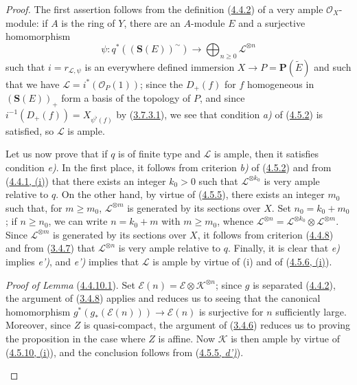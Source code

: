 \begin{proof}
The first assertion follows from the definition
(\hyperref[II.4.4.2]{4.4.2}) of a very ample $\mathcal{O}_X$-module: if
$A$ is the ring of $Y$, there are an $A$-module $E$ and a surjective
homomorphism
\[
  \psi:q^*((\mathbf{S}(E))^{\sim})\longrightarrow
  \bigoplus_{n\geq0}\mathcal{L}^{\otimes n}
\]
such that $i=r_{\mathcal{L},\psi}$ is an everywhere defined immersion
$X\to P=\mathbf{P}(\widetilde{E})$ and such that we have
$\mathcal{L}=i^*(\mathcal{O}_P(1))$; since the $D_+(f)$ for $f$ homogeneous
in $(\mathbf{S}(E))_+$ form a basis of the topology of $P$, and since
$i^{-1}(D_+(f))=X_{\psi^\flat(f)}$ by
(\hyperref[II.3.7.3.1]{3.7.3.1}), we see that condition \emph{a)} of
(\hyperref[II.4.5.2]{4.5.2}) is satisfied, so $\mathcal{L}$ is ample.

Let us now prove that if $q$ is of finite type and $\mathcal{L}$ is
ample, then it satisfies condition \emph{e)}. In the first place, it follows from criterion \emph{b)}
of (\hyperref[II.4.5.2]{4.5.2}) and from
(\hyperref[II.4.4.1]{4.4.1, (i)}) that there exists
an integer $k_0>0$ such that $\mathcal{L}^{\otimes k_0}$ is very ample
relative to $q$. On the other hand, by virtue of
(\hyperref[II.4.5.5]{4.5.5}), there exists an integer $m_0$ such that, for
$m\geq m_0$, $\mathcal{L}^{\otimes m}$ is generated by its sections
over $X$. Set $n_0=k_0+m_0$; if $n\geq n_0$, we can write
$n=k_0+m$ with $m\geq m_0$, whence
$\mathcal{L}^{\otimes n}
=\mathcal{L}^{\otimes k_0}\otimes\mathcal{L}^{\otimes m}$. Since
$\mathcal{L}^{\otimes m}$ is generated by its sections over $X$, it
follows from criterion (\hyperref[II.4.4.8]{4.4.8}) and from
(\hyperref[II.3.4.7]{3.4.7}) that $\mathcal{L}^{\otimes n}$ is very ample
relative to $q$. Finally, it is clear that \emph{e)} implies \emph{e')}, and \emph{e')} implies
that $\mathcal{L}$ is ample by virtue of (i) and of
(\hyperref[II.4.5.6]{4.5.6, (i)}).

\begin{env}[4.5.10.1]
\label{II.4.5.10.1}
\emph{Proof of Lemma} (\hyperref[II.4.4.10.1]{4.4.10.1}). Set
$\mathcal{E}(n)=\mathcal{E}\otimes\mathcal{K}^{\otimes n}$; since $g$ is
separated (\hyperref[II.4.4.2]{4.4.2}), the argument of
(\hyperref[II.3.4.8]{3.4.8}) applies and reduces us to seeing that
the canonical homomorphism
$g^*(g_*(\mathcal{E}(n)))\to\mathcal{E}(n)$ is surjective for $n$ sufficiently
large. Moreover, since $Z$ is quasi-compact, the argument of
(\hyperref[II.3.4.6]{3.4.6}) reduces us to proving the proposition in the case
where $Z$ is affine. Now $\mathcal{K}$ is then ample by virtue of
(\hyperref[II.4.5.10]{4.5.10, (i)}), and the conclusion follows from
(\hyperref[II.4.5.5]{4.5.5, \emph{d')}}).
\end{env}
\end{proof}

